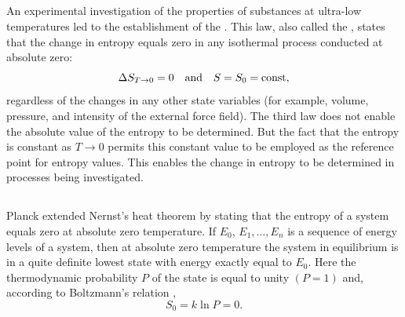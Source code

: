 \subsection{}\label{11.8.2} An experimental investigation of the properties of substances at ultra-low temperatures led to the establishment of the . This law, also called the , states that the change in entropy equals zero in any isothermal process conducted at absolute zero:
\begin{equation*}%
\Delta S_{T \to 0} = 0 \qand S = S_{0} = \textrm{const},
\end{equation*}
regardless of the changes in any other state variables (for example, volume, pressure, and intensity of the external force field). The third law does not enable the absolute value of the entropy to be determined. But the fact that the entropy is constant as $T \to 0$ permits this constant value to be employed as the reference point for entropy values. This enables the change in en­tropy to be determined in processes being investigated.

\subsection{}\label{11.8.3} Planck extended Nernst's heat theorem by stating that the entropy of a system equals zero at absolute zero tempera­ture. If $E_{0}$, $E_{1}, \ldots , E_{n}$ is a sequence of energy levels  of a system, then at absolute zero temperature the system in equilibrium is in a quite definite lowest state with energy exactly equal to $E_{0}$. Here the thermodynamic probability $P$ of the state  is equal to unity $(P = 1)$ and, according to Boltzmann's relation ,
\begin{equation*}%
S_{0}= k \ln P = 0.
\end{equation*}

